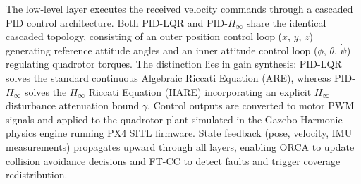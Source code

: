 \documentclass[11pt]{article}
\begin{document}
The low-level layer executes the received velocity commands through a
cascaded PID control architecture. Both PID-LQR and PID-$H_\infty$ share the
identical cascaded topology, consisting of an outer position control loop
($x$, $y$, $z$) generating reference attitude angles and an inner attitude
control loop ($\phi$, $\theta$, $\dot{\psi}$) regulating quadrotor torques.
The distinction lies in gain synthesis: PID-LQR solves the standard continuous
Algebraic Riccati Equation (ARE), whereas PID-$H_\infty$ solves the $H_\infty$
Riccati Equation (HARE) incorporating an explicit $H_\infty$ disturbance
attenuation bound $\gamma$. Control outputs are converted to motor PWM signals
and applied to the quadrotor plant simulated in the Gazebo Harmonic physics
engine running PX4 SITL firmware. State feedback (pose, velocity, IMU
measurements) propagates upward through all layers, enabling ORCA to
update collision avoidance decisions and FT-CC to detect faults and
trigger coverage redistribution.
\end{document}

